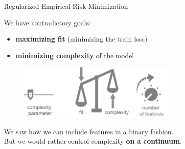 \documentclass[11pt,compress,t,notes=noshow, xcolor=table]{beamer}
\begin{document}
\begin{vbframe}{Regularized Empirical Risk Minimization}


We have contradictory goals:

\begin{itemize}
\item \textbf{maximizing fit} (minimizing the train loss)
\item \textbf{minimizing complexity} of the model
\end{itemize}

\lz

\begin{center}
\begin{figure}
\includegraphics[width=0.7\textwidth]{figure_man/complexity-vs-fit2.png}
\end{figure}
\end{center}

\lz

We saw how we can include features in a binary fashion.\\
But we would rather control complexity \textbf{on a continuum}. 

\end{vbframe}
\end{document}
